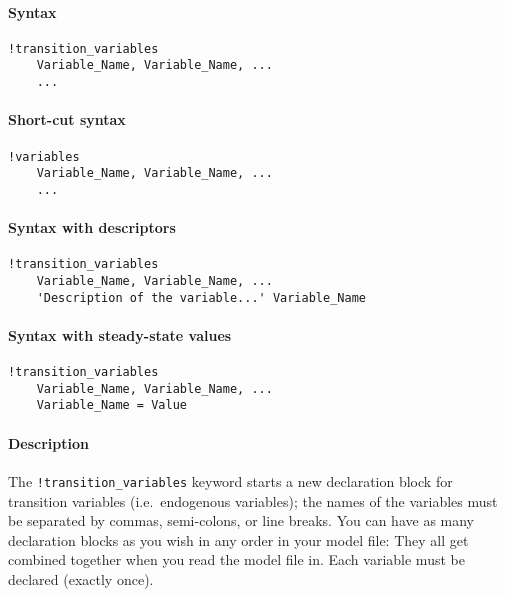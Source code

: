 


	\paragraph{Syntax}

\begin{verbatim}
!transition_variables
    Variable_Name, Variable_Name, ...
    ...
\end{verbatim}

\paragraph{Short-cut syntax}

\begin{verbatim}
!variables
    Variable_Name, Variable_Name, ...
    ...
\end{verbatim}

\paragraph{Syntax with descriptors}

\begin{verbatim}
!transition_variables
    Variable_Name, Variable_Name, ...
    'Description of the variable...' Variable_Name
\end{verbatim}

\paragraph{Syntax with steady-state
values}

\begin{verbatim}
!transition_variables
    Variable_Name, Variable_Name, ...
    Variable_Name = Value
\end{verbatim}

\paragraph{Description}

The \texttt{!transition\_variables} keyword starts a new declaration
block for transition variables (i.e.~endogenous variables); the names of
the variables must be separated by commas, semi-colons, or line breaks.
You can have as many declaration blocks as you wish in any order in your
model file: They all get combined together when you read the model file
in. Each variable must be declared (exactly once).

